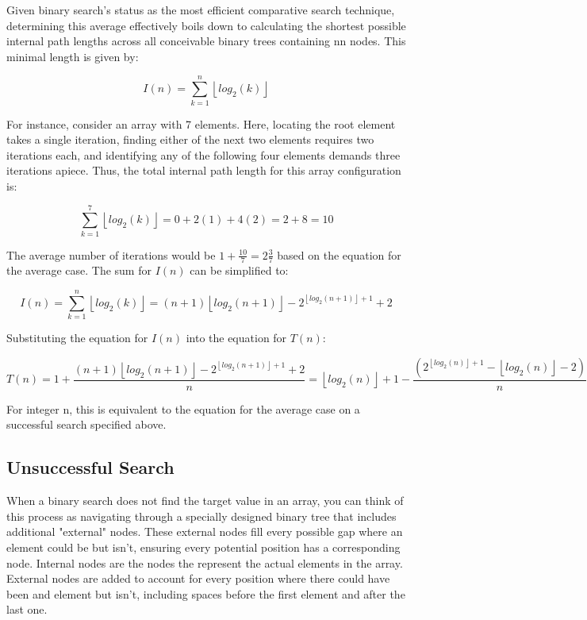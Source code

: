 \documentclass{article}
\begin{document}
\break
Given binary search's status as the most efficient comparative search technique, determining this average effectively boils down to calculating the shortest possible internal path lengths across all conceivable binary trees containing nn nodes. This minimal length is given by:

$$I(n) = \sum_{k=1}^n \left \lfloor {log_2 (k)}\right \rfloor$$

For instance, consider an array with 7 elements. Here, locating the root element takes a single iteration, finding either of the next two elements requires two iterations each, and identifying any of the following four elements demands three iterations apiece. Thus, the total internal path length for this array configuration is:

$$\sum_{k=1}^{7} \left \lfloor {log_2 (k)}\right \rfloor = 0 + 2(1) + 4(2) = 2 + 8 = 10$$

The average number of iterations would be $1 + \frac{10}{7} = 2\frac{3}{7}$ based on the equation for the average case. The sum for $I(n)$ can be simplified to:

$$I(n) = \sum_{k=1}^n \left \lfloor {log_2 (k)}\right \rfloor = (n + 1) \left \lfloor {log_2 (n + 1)}\right \rfloor - 2^{\left \lfloor {log_2 (n + 1)}\right \rfloor + 1} + 2$$

Substituting the equation for $I(n)$ into the equation for $T(n)$:

$$T(n) = 1 + \frac{(n + 1)\left \lfloor {log_2 (n + 1)}\right \rfloor - 2^{\left \lfloor {log_2 (n + 1)}\right \rfloor + 1} + 2}{n} = \left \lfloor {log_2 (n)}\right \rfloor  + 1  - \frac{(2^{\left \lfloor {log_2 (n)}\right \rfloor  + 1} - \left \lfloor {log_2 (n)}\right \rfloor  - 2)}{n}$$

For integer n, this is equivalent to the equation for the average case on a successful search specified above.

\subsection{Unsuccessful Search}

\hspace{\parindent}

When a binary search does not find the target value in an array, you can think of this process as navigating through a specially designed binary tree that includes additional "external" nodes. These external nodes fill every possible gap where an element could be but isn't, ensuring every potential position has a corresponding node. Internal nodes are the nodes the represent the actual elements in the array. External nodes are added to account for every position where there could have been and element but isn't, including spaces before the first element and after the last one.
\newline
\end{document}
